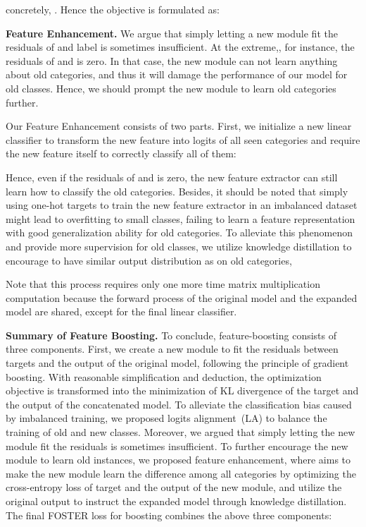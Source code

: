 \documentclass[runningheads]{llncs}
\begin{document}
concretely, .
Hence the objective is formulated as:



\noindent\textbf{Feature Enhancement.}\label{sec:FE}
We argue that simply letting a new module  fit the residuals of  and label  is sometimes insufficient.  At the extreme,, for instance, the residuals of  and  is zero. In that case, the new module  can not learn anything about old categories, and thus it will damage the performance of our model for old classes. Hence, we should prompt the new module  to learn old categories further.

Our Feature Enhancement consists of two parts. First, we initialize a new linear classifier  to transform the new feature  into logits of all seen categories and require the new feature itself to correctly classify all of them:

Hence, even if the residuals of  and  is zero, the new feature extractor  can still learn how to classify the old categories. Besides, it should be noted that simply using one-hot targets to train the new feature extractor in an imbalanced dataset might lead to overfitting to small classes, failing to learn a  feature representation with good generalization ability for old categories. To alleviate this phenomenon and provide more supervision for old classes, we utilize knowledge distillation to encourage  to have similar output distribution as  on old categories,

Note that this process requires only one more time matrix multiplication computation because the forward process of the original model  and the expanded model  are shared, except for the final linear classifier.

\noindent\textbf{Summary of Feature Boosting.}
To conclude, feature-boosting consists of three components. First, we create a new module to fit the residuals between targets and the output of the original model, following the principle of gradient boosting. With reasonable simplification and deduction,  the optimization objective is transformed into the minimization of KL divergence of the target and the output of the concatenated model. To alleviate the classification bias caused by imbalanced training, we proposed logits alignment~(LA) to balance the training of old and new classes. Moreover, we argued that simply letting the new module fit the residuals is sometimes insufficient. To further encourage the new module to learn old instances, we proposed feature enhancement, where  aims to make the new module learn the difference among all categories by optimizing the cross-entropy loss of target and the output of the new module, and  utilize the original output to instruct the expanded model through knowledge distillation.  
The final FOSTER loss for boosting combines the above three components:
\end{document}
